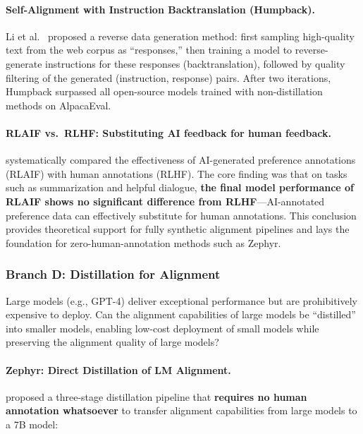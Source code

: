 \paragraph{Self-Alignment with Instruction Backtranslation (Humpback).}
Li et al.\ \cite{li2023humpback} proposed a reverse data generation method:
first sampling high-quality text from the web corpus as ``responses,''
then training a model to reverse-generate instructions for these responses (backtranslation),
followed by quality filtering of the generated (instruction, response) pairs.
After two iterations,
Humpback surpassed all open-source models trained with non-distillation methods on AlpacaEval.

\paragraph{RLAIF vs.\ RLHF: Substituting AI feedback for human feedback.}
 systematically compared the effectiveness of AI-generated preference annotations (RLAIF) with human annotations (RLHF).
The core finding was that
on tasks such as summarization and helpful dialogue,
\textbf{the final model performance of RLAIF shows no significant difference from RLHF}---AI-annotated preference data can effectively substitute for human annotations.
This conclusion provides theoretical support for fully synthetic alignment pipelines
and lays the foundation for zero-human-annotation methods such as Zephyr.

\subsubsection{Branch D: Distillation for Alignment}
\label{sec:t7-distillation}

\begin{problembox}
Large models (e.g., GPT-4) deliver exceptional performance but are prohibitively expensive to deploy.
Can the alignment capabilities of large models be ``distilled'' into smaller models,
enabling low-cost deployment of small models while preserving the alignment quality of large models?
\end{problembox}

\paragraph{Zephyr: Direct Distillation of LM Alignment.}
 proposed a three-stage distillation pipeline that
\textbf{requires no human annotation whatsoever} to transfer alignment capabilities from large models to a 7B model:

